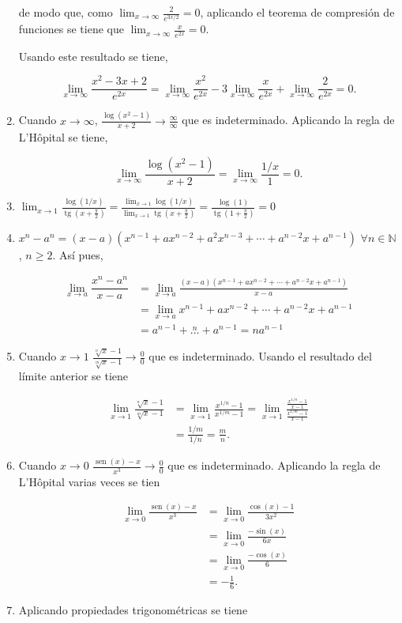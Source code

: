 \documentclass[
  a4paper,
]{scrreport}
\theoremstyle{definition}
\theoremstyle{remark}
\begin{document}
\begin{tcolorbox}
\begin{enumerate}
  de modo que, como \(\lim_{x\to\infty}\frac{2}{e^{3x/2}}=0\), aplicando
  el teorema de compresión de funciones se tiene que
  \(\lim_{x\to\infty} \frac{x}{e^{2x}}=0\).

  Usando este resultado se tiene,

  \[\lim_{x\to\infty}\dfrac{x^2-3x+2}{e^{2x}} = \lim_{x\to\infty}\dfrac{x^2}{e^{2x}}-3\lim_{x\to\infty} \frac{x}{e^{2x}} + \lim_{x\to\infty} \frac{2}{e^{2x}} = 0.
  \]
\item
  Cuando \(x\to\infty\),
  \(\frac{\log(x^2-1)}{x+2}\to \frac{\infty}{\infty}\) que es
  indeterminado. Aplicando la regla de L'Hôpital se tiene,

  \[
  \lim_{x\to\infty}\dfrac{\log(x^2-1)}{x+2} =\lim_{x\to\infty}\frac{1/x}{1} =0.
  \]
\item
  \(\displaystyle \lim_{x\to 1}\frac{\log(1/x)}{\operatorname{tg}(x+\frac{\pi}{2})} = \frac{\lim_{x\to 1}\log(1/x)}{\lim_{x\to 1}\operatorname{tg}(x+\frac{\pi}{2})} = \frac{\log(1)}{\operatorname{tg}(1+\frac{\pi}{2})}=0\)
\item
  \(x^n-a^n = (x-a)(x^{n-1}+ax^{n-2}+a^2x^{n-3}+\cdots + a^{n-2}x+a^{n-1})\)
  \(\forall n\in\mathbb{N}\), \(n\geq 2\). Así pues,

  \begin{align*}
  \lim_{x\to a}\dfrac{x^n-a^n}{x-a} &= \lim_{x\to a}\frac{(x-a)(x^{n-1}+ax^{n-2}+\cdots + a^{n-2}x+a^{n-1})}{x-a} \\ 
  &= \lim_{x\to a} x^{n-1}+ax^{n-2}+\cdots + a^{n-2}x+a^{n-1}\\  
  &= a^{n-1}+\stackrel{n}{\dots}+a^{n-1} = na^{n-1}
  \end{align*}
\item
  Cuando \(x\to 1\)
  \(\frac{\sqrt[n]{x}-1}{\sqrt[m]{x}-1}\to \frac{0}{0}\) que es
  indeterminado. Usando el resultado del límite anterior se tiene

  \begin{align*}
  \lim_{x\to 1}\frac{\sqrt[n]{x}-1}{\sqrt[m]{x}-1} 
  &= \lim_{x\to 1}\frac{x^{1/n}-1}{x^{1/m}-1} 
  = \lim_{x\to 1}\frac{\frac{x^{1/n}-1}{x-1}}{\frac{x^{1/m}-1}{x-1}} \\
  &= \frac{1/m}{1/n}   
  = \frac{m}{n}.
  \end{align*}
\item
  Cuando \(x\to 0\)
  \(\frac{\operatorname{sen}(x)-x}{x^3}\to \frac{0}{0}\) que es
  indeterminado. Aplicando la regla de L'Hôpital varias veces se tien

  \begin{align*}
  \lim_{x\to 0}\frac{\operatorname{sen}(x)-x}{x^3} 
  &= \lim_{x\to 0}\frac{\cos(x) -1}{3x^2} \tag{L'Hôpital} \\
  &= \lim_{x\to 0}\frac{-\sin(x)}{6x} \tag{L'Hôpital} \\
  &= \lim_{x\to 0}\frac{-\cos(x)}{6} \tag{L'Hôpital} \\
  &= -\frac{1}{6}.
  \end{align*}
\item
  Aplicando propiedades trigonométricas se tiene


\end{enumerate}
\end{tcolorbox}
\end{document}
